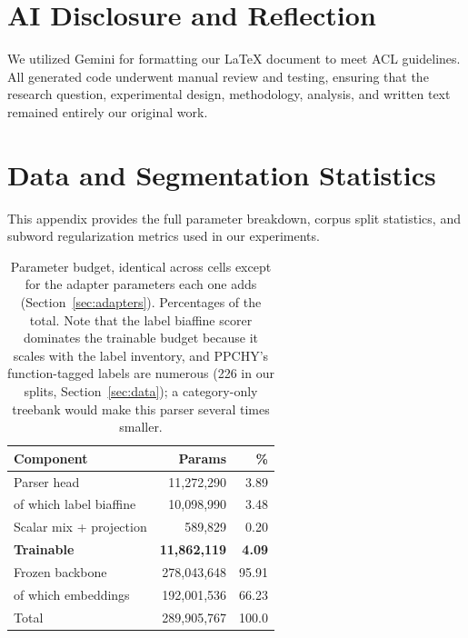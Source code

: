 \documentclass[11pt]{article}
\begin{document}
\section*{AI Disclosure and Reflection}

We utilized Gemini for formatting our LaTeX document to meet ACL guidelines. All generated code underwent manual review and testing, ensuring that the research question, experimental design, methodology, analysis, and written text remained entirely our original work.



\appendix

\section{Data and Segmentation Statistics}
\label{app:data}
This appendix provides the full parameter breakdown, corpus split statistics, and subword regularization metrics used in our experiments.
\begin{table}[H]
\centering
\small
\setlength{\tabcolsep}{4pt}
\begin{tabular}{@{}lrr@{}}
\toprule
\textbf{Component} & \textbf{Params} & \textbf{\%} \\
\midrule
Parser head                  & 11{,}272{,}290 & 3.89 \\
\quad of which label biaffine & 10{,}098{,}990 & 3.48 \\
Scalar mix + projection      &     589{,}829 & 0.20 \\
\midrule
\textbf{Trainable}           & \textbf{11{,}862{,}119} & \textbf{4.09} \\
Frozen backbone              & 278{,}043{,}648 & 95.91 \\
\quad of which embeddings    & 192{,}001{,}536 & 66.23 \\
\midrule
Total                        & 289{,}905{,}767 & 100.0 \\
\bottomrule
\end{tabular}
\caption{Parameter budget, identical across cells except for the adapter
parameters each one adds (Section~\ref{sec:adapters}). Percentages of the total.
Note that the label biaffine scorer dominates the trainable budget because it
scales with the label inventory, and PPCHY's function-tagged labels are numerous
(226 in our splits, Section~\ref{sec:data}); a category-only treebank would make
this parser several times smaller.}
\label{tab:params}
\end{table}
\end{document}
